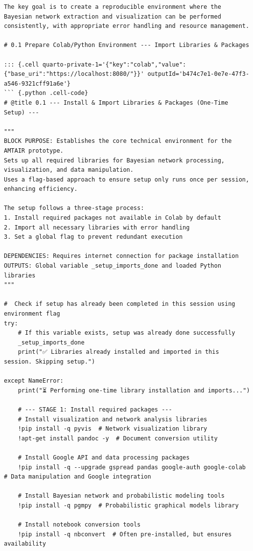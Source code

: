 \documentclass[
  11pt,
  letterpaper,
]{book}
\begin{document}
\begin{verbatim}
The key goal is to create a reproducible environment where the Bayesian network extraction and visualization can be performed consistently, with appropriate error handling and resource management.

# 0.1 Prepare Colab/Python Environment --- Import Libraries & Packages

::: {.cell quarto-private-1='{"key":"colab","value":{"base_uri":"https://localhost:8080/"}}' outputId='b474c7e1-0e7e-47f3-a546-9321cff91a6e'}
``` {.python .cell-code}
# @title 0.1 --- Install & Import Libraries & Packages (One-Time Setup) ---

"""
BLOCK PURPOSE: Establishes the core technical environment for the AMTAIR prototype.
Sets up all required libraries for Bayesian network processing, visualization, and data manipulation.
Uses a flag-based approach to ensure setup only runs once per session, enhancing efficiency.

The setup follows a three-stage process:
1. Install required packages not available in Colab by default
2. Import all necessary libraries with error handling
3. Set a global flag to prevent redundant execution

DEPENDENCIES: Requires internet connection for package installation
OUTPUTS: Global variable _setup_imports_done and loaded Python libraries
"""

#  Check if setup has already been completed in this session using environment flag
try:
    # If this variable exists, setup was already done successfully
    _setup_imports_done
    print("✅ Libraries already installed and imported in this session. Skipping setup.")

except NameError:
    print("⏳ Performing one-time library installation and imports...")

    # --- STAGE 1: Install required packages ---
    # Install visualization and network analysis libraries
    !pip install -q pyvis  # Network visualization library
    !apt-get install pandoc -y  # Document conversion utility

    # Install Google API and data processing packages
    !pip install -q --upgrade gspread pandas google-auth google-colab  # Data manipulation and Google integration

    # Install Bayesian network and probabilistic modeling tools
    !pip install -q pgmpy  # Probabilistic graphical models library

    # Install notebook conversion tools
    !pip install -q nbconvert  # Often pre-installed, but ensures availability


\end{verbatim}
\end{document}

